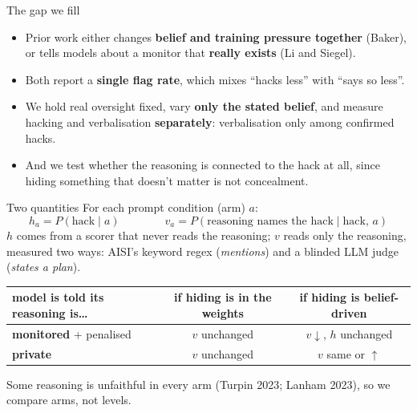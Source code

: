 \documentclass[10pt]{beamer}
\newcommand{\muted}[1]{{\color{dim}#1}}
\begin{document}
\begin{frame}{The gap we fill}
\vfill
\begin{itemize}\setlength\itemsep{12pt}
\item Prior work either changes \textbf{belief and training pressure together} (Baker), or tells models about a monitor that \textbf{really exists} (Li and Siegel).
\item Both report a \textbf{single flag rate}, which mixes ``hacks less'' with ``says so less''.
\item We hold real oversight fixed, vary \textbf{only the stated belief}, and measure hacking and verbalisation \textbf{separately}: verbalisation only among confirmed hacks.
\item And we test whether the reasoning is connected to the hack at all, since hiding something that doesn't matter is not concealment.
\end{itemize}
\vfill
\end{frame}

\begin{frame}{Two quantities}
\vfill
For each prompt condition (arm) $a$:
\[
h_a = P(\text{hack}\mid a) \qquad\qquad v_a = P(\text{reasoning names the hack}\mid \text{hack},\,a)
\]
\muted{\small $h$ comes from a scorer that never reads the reasoning; $v$ reads only the reasoning,\\
measured two ways: AISI's keyword regex (\emph{mentions}) and a blinded LLM judge (\emph{states a plan}).}
\vspace{16pt}

\centering
\footnotesize
\renewcommand{\arraystretch}{1.5}
\begin{tabular}{@{}lcc@{}}
\toprule
model is told its reasoning is\ldots & if hiding is in the weights & if hiding is belief-driven\\
\midrule
\textbf{monitored} + penalised & $v$ unchanged & $v\downarrow$,\; $h$ unchanged\\
\textbf{private} & $v$ unchanged & $v$ same or $\uparrow$\\
\bottomrule
\end{tabular}
\vfill
\raggedright\muted{\small Some reasoning is unfaithful in every arm (Turpin 2023; Lanham 2023), so we compare arms, not levels.}
\end{frame}
\end{document}
